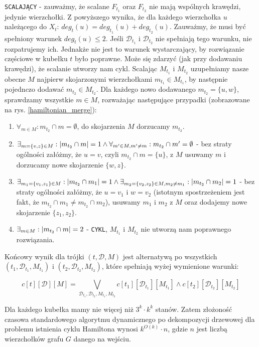 \documentclass[12pt, oneside]{report}
\newcommand\Omicron{O}
\begin{document}
\texttt{SCALAJĄCY} - zauważmy, że scalane $F_{t_1}$ oraz $F_{t_2}$ nie mają wspólnych krawędzi, jedynie wierzchołki. Z powyższego wynika, że dla każdego wierzchołka $u$ należącego do $X_t$: $deg_t(u) = deg_{t_1}(u) + deg_{t_2}(u)$. Zauważmy, że musi być spełniony warunek $deg_t(u) \leq 2$. Jeśli $\mathcal{D}_{t_1}$ i $\mathcal{D}_{t_2}$ nie spełniają tego warunku, nie rozpatrujemy ich. Jednakże nie jest to warunek wystarczający, by rozwiązanie częściowe w kubełku $t$ było poprawne. Może się zdarzyć (jak przy dodawaniu krawędzi), że scalanie utworzy nam cykl. Scalając $M_{t_1}$ i $M_{t_2}$ uzupełniamy nasze obecne $M$ najpierw skojarzonymi wierzchołkami $m_{t_1} \in M_{t_1}$, by następnie pojednczo dodawać $m_{t_2} \in M_{t_2}$. Dla każdego nowo dodawanego $m_{t_2} = \{u, w\}$, sprawdzamy wszystkie $m \in M$, rozważając następujące przypadki (zobrazowane na rys. \ref{hamiltonian_merge}):
\begin{enumerate}
\item $\forall_{m \in M}: m_{t_2} \cap m = \emptyset$, do skojarzenia $M$ dorzucamy $m_{t_2}$.
\item $\exists_{m = \{v, z\} \in M}: \abs{m_{t_2} \cap m} = 1 \wedge \forall_{m^{\prime} \in M, m^{\prime} \ne m}: m_{t_2} \cap m^{\prime} = \emptyset$ - bez straty ogólności załóżmy, że $u = v$, czyli $m_{t_2} \cap m = \{u\}$, z $M$ usuwamy $m$ i dorzucamy nowe skojarzenie $\{w, z\}$.
\item $\exists_{m_1 = \{v_1, z_1\} \in M}: \abs{m_{t_2} \cap m_1} = 1 \wedge \exists_{m_2 = \{v_2, z_2\} \in M, m_2 \ne m_1}: \abs{m_{t_2} \cap m_2} = 1$ - bez straty ogólności załóżmy, że $u = v_1$ i $w = v_2$ (istotnym spostrzeżeniem jest fakt, że $m_{t_2} \cap m_1 \ne m_{t_2} \cap m_2$), usuwamy $m_1$ i $m_2$ z $M$ oraz dodajemy nowe skojarzenie $\{z_1, z_2\}$.
\item $\exists_{m \in M}: \abs{m_{t_2} \cap m} = 2$ - \texttt{CYKL}, $M_{t_1}$ i $M_{t_2}$ nie utworzą nam poprawnego rozwiązania.
\end{enumerate}

Końcowy wynik dla trójki $(t, \mathcal{D}, M)$ jest alternatywą po wszystkich $(t_1, \mathcal{D}_{t_1}, M_{t_1})$ i $(t_2, \mathcal{D}_{t_2}, M_{t_2})$, które spełniają wyżej wymienione warunki:

$$c[t][\mathcal{D}][M] = \bigvee \limits_{\mathcal{D}_{t_1}, \mathcal{D}_{t_2}, M_{t_1}, M_{t_2}} c[t_1][\mathcal{D}_{t_1}][M_{t_1}] \wedge c[t_2][\mathcal{D}_{t_2}][M_{t_2}]$$

Dla każdego kubełka mamy nie więcej niż $3^k \cdot k^k$ stanów. Zatem złożoność czasowa standardowego algorytmu dynamicznego po dekompozycji drzewowej dla problemu istnienia cyklu Hamiltona wynosi $k^{\Omicron(k)} \cdot n$, gdzie $n$ jest liczbą wierzchołków grafu $G$ danego na wejściu. 
\end{document}
